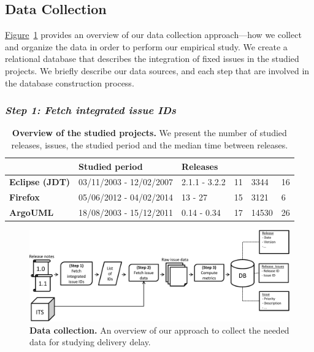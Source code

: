 \subsection{Data Collection}

\hyperref[ch4:fig:overview]{Figure}~\ref{ch4:fig:overview} provides an overview of our
data collection approach---how we collect and organize the data in order to
perform our empirical study. We create a relational database that describes the
integration of fixed issues in the studied projects. We briefly describe our
data sources, and each step that are involved in the database construction process. 

\subsubsection*{\textbf{\textit{Step 1: Fetch integrated issue IDs}}}


\begin{table}
	\footnotesize
	\caption{\textbf{Overview of the studied projects.} We present the number
	of studied releases, issues, the studied period and the median time
	between releases.}
	\label{ch4:tbl:consideredReleases}
	\begin{tabular}{L{1.65cm}C{2.5cm}C{1.5cm}C{1.0cm}R{2.45cm}R{4.25cm}}
		\hline 
		 & \textbf{Studied period} &
		\textbf{Releases} & 
		& 
		 & \tabularnewline
		\hline 
		\hline 
		\textbf{Eclipse (JDT)} & 03/11/2003 - 12/02/2007 & 2.1.1
		- 3.2.2 & 11 & 3344 & 16\tabularnewline
		\hline 
		\textbf{Firefox} & 05/06/2012 - 04/02/2014 & 13 - 27 &
		15 & 3121 & 6\tabularnewline
		\hline 
		\textbf{ArgoUML} & 18/08/2003 - 15/12/2011 & 0.14 - 0.34
		& 17 & 14530 & 26 \tabularnewline
		\hline 
	\end{tabular}
\end{table}

\begin{figure}
	\centering
	\includegraphics[width=\textwidth]{chapters/chapter4/figures/database_construction.pdf}
	\caption{\textbf{Data collection.} An overview of our approach to
	collect the needed data for studying delivery delay.}
	\label{ch4:fig:overview}
\end{figure} 

